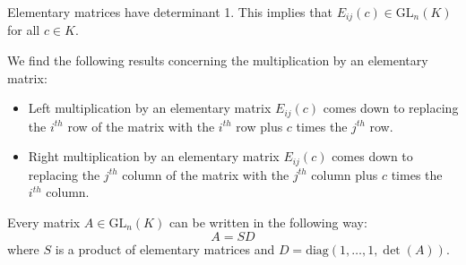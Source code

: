     \begin{property}
        Elementary matrices have determinant 1. This implies that $E_{ij}(c)\in\text{GL}_n(K)$ for all $c\in K$.
    \end{property}
    \begin{property}
        We find the following results concerning the multiplication by an elementary matrix:
        \begin{itemize}
            \item Left multiplication by an elementary matrix $E_{ij}(c)$ comes down to replacing the $i^{th}$ row of the matrix with the $i^{th}$ row plus $c$ times the $j^{th}$ row.
            \item Right multiplication by an elementary matrix $E_{ij}(c)$ comes down to replacing the $j^{th}$ column of the matrix with the $j^{th}$ column plus $c$ times the $i^{th}$ column.
        \end{itemize}
    \end{property}

    \begin{property}\label{linalgebra:theorem:elementary_matrices}
        Every matrix $A\in\text{GL}_n(K)$ can be written in the following way: \[A = SD\] where $S$ is a product of elementary matrices and $D=\text{diag}(1,\dotso,1,\det(A))$.
    \end{property}

